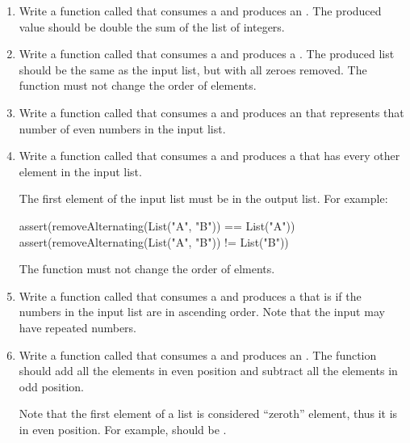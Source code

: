\documentclass{book}
\begin{document}
\begin{enumerate}

  \item Write a function called  that consumes a
   and produces an . The produced
  value should be double the sum of the list of integers.

  \item Write a function called  that consumes a
   and produces a .
  The produced list should be the same as the input list, but with all zeroes
  removed. The function must not change the order of elements.

  \item Write a function called  that consumes a
   and produces an  that represents
  that number of even numbers in the input list.

  \item Write a function called  that consumes a
   and produces a  that
  has every other element in the input list.

  The first element of the input list must be in the output list.
  For example:
  \begin{scalacode}
  assert(removeAlternating(List("A", "B")) == List("A"))
  assert(removeAlternating(List("A", "B")) != List("B"))
  \end{scalacode}

  The function must not change the order of elments.

  \item Write a function called  that consumes a
   and produces a  that is
   if the numbers in the input list are in ascending order.
  Note that the input may have repeated numbers.

  \item Write a function called  that consumes a
   and produces an . The
  function should add all the elements in even position and subtract all the
  elements in odd position.

  Note that the first element of a list is considered
  ``zeroth'' element, thus it is in even position.
  For example,  should be
  .


\end{enumerate}
\end{document}
